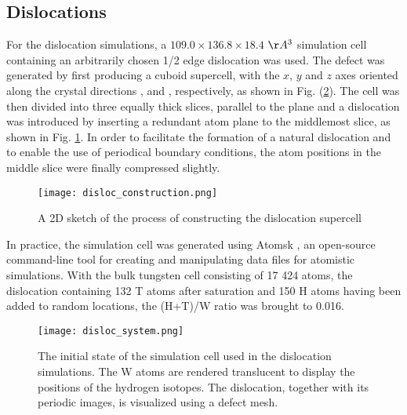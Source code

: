 \subsection{Dislocations}
For the dislocation simulations, a  $109.0 \times 136.8 \times 18.4$ $\AA^3$ simulation cell containing an arbitrarily chosen 1/2\hkl[1 1 1] edge dislocation was used. 
The defect was generated by first producing a cuboid supercell, with the $x$, $y$ and $z$ axes oriented along the crystal directions \hkl[1 1 1], \hkl[1 1 -2] and \hkl[-1 1 0], respectively, as shown in Fig. (\ref{Fig:disloc_system}). 
The cell was then divided into three equally thick slices, parallel to the  plane and a dislocation was introduced by inserting a redundant  atom plane to the middlemost slice, as shown in Fig. \ref{Fig:disloc_construction}. 
In order to facilitate the formation of a natural dislocation and to enable the use of periodical boundary conditions, the atom positions in the middle slice were finally compressed slightly.

\begin{figure}[!ht]
\center
\texttt{[image: disloc\_construction.png]}
\caption{A 2D sketch of the process of constructing the dislocation supercell}
\label{Fig:disloc_construction}
\end{figure}

In practice, the simulation cell was generated using Atomsk \cite{hirel2015atomsk}, an open-source command-line tool for creating and manipulating data files for atomistic simulations.
With the bulk tungsten cell consisting of 17 424 atoms, the dislocation containing 132 T atoms after saturation and 150 H atoms having been added to random locations, the (H+T)/W ratio was brought to 0.016. 

\begin{figure}[!ht]
\center
\texttt{[image: disloc\_system.png]}
\caption{The initial state of the simulation cell used in the dislocation simulations. 
The W atoms are rendered translucent to display the positions of the hydrogen isotopes. 
The dislocation, together with its periodic images, is visualized using a defect mesh.}
\label{Fig:disloc_system}
\end{figure}

